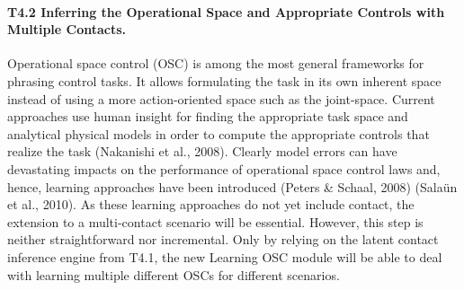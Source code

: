 \documentclass[12pt,a4paper,twoside]{report}
\begin{document}
\paragraph{T4.2 Inferring the Operational Space and Appropriate Controls with Multiple Contacts.} 
Operational space control (OSC) is among the most general frameworks for phrasing control tasks. It allows
formulating the task in its own inherent space instead of using a more action-oriented space such as the
joint-space. Current approaches use human insight for finding the appropriate task space and analytical
physical models in order to compute the appropriate controls that realize the task (Nakanishi et al., 2008).
Clearly model errors can have devastating impacts on the performance of operational space control laws
and, hence, learning approaches have been introduced (Peters \& Schaal, 2008) (Salaün et al., 2010). As
these learning approaches do not yet include contact, the extension to a multi-contact scenario will be
essential. However, this step is neither straightforward nor incremental. Only by relying on the latent
contact inference engine from T4.1, the new Learning OSC module will be able to deal with learning
multiple different OSCs for different scenarios.
\end{document}
